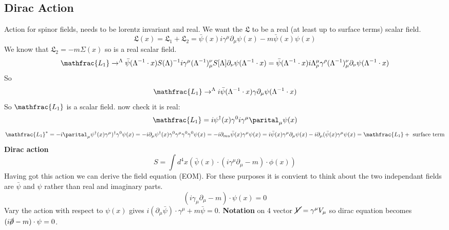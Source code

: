 \documentclass[12pt, a4paper, twoside, titlepage]{article}
\begin{document}
        \subsection{Dirac Action}
        Action for spinor fields, needs to be lorentz invariant and real. We want the $\mathfrak{L}$ to be a real (at least up to surface terms) scalar field. 
        $$
        \mathfrak{L}(x) = \mathfrak{L_1} + \mathfrak{L_2} = \bar \psi(x) i \gamma^{\mu} \partial _{\mu} \psi(x) - m \bar \psi(x) \psi(x)
        $$
        We know that $\mathfrak{L_2} = - m \Sigma(x)$ so is a real scalar field.
        $$
        \mathfrac{L_1} \rightarrow^{\Lambda} \bar \psi(\Lambda^{-1} \cdot x) S(\Lambda)^{-1} i \gamma^{\mu} (\Lambda^{-1})^{\nu}_{\mu} S[\Lambda] \partial _{\nu} \psi(\Lambda^{-1} \cdot x) = \bar \psi( \Lambda^{-1} \cdot x) i \Lambda^{\mu}_{\rho} \gamma^{\rho} (\Lambda^{-1})^{\nu}_{\mu} \partial _{\nu} \psi(\Lambda^{-1} \cdot x)
        $$
        So
        $$
        \mathfrac{L_1} \rightarrow^{\Lambda} i \bar \psi(\Lambda^{-1} \cdot x) \gamma \partial_{\mu} \psi(\Lambda^{-1} \cdot x)
        $$
        So $\mathfrac{L_1}$ is a scalar field. now check it is real:
        $$
        \mathfrac{L_1} = i \psi^{\dagger}(x) \gamma^0 i \gamma^{\mu} \parital_{\mu} \psi(x)
        $$
        $$
        \mathfrac{L_1}^* = -i \parital_{\mu} \psi^{\dagger}(x) \gamma^{\mu})^{\dagger}  \gamma^0 \psi(x) = - i \partial_{\mu} \psi^{\dagger}(x) \gamma^0 \gamma ^{\mu} \gamma^0 \gamma^0 \psi(x) = - i \partial_{mu} \bar \psi(x) \gamma^{\mu} \psi(x) = i \bar \psi(x) \gamma^{\mu} \partial_{\mu} \psi(x) - i \partial_{\mu} (\bar \psi(x) \gamma^{\mu} \psi(x) = \mathfrac{L_1} + \text{ surface term}
        $$
        \textbf{Dirac action}
        \begin{equation}
                S = \int d^4 x (\bar \psi(x) \cdot (i \gamma^{\mu}\partial_{\mu} - m) \cdot \phi(x))
        \end{equation}
        Having got this action we can derive the field equation (EOM). For these purposes it is convient to think about the two independant fields are $\bar \psi$ and $\psi$ rather than real and imaginary parts.
        \begin{equation}
                (i \gamma_{\mu}\partial_{\mu} -  m) \cdot \psi(x) = 0
\end{equation}
Vary the action with respect to $\psi(x)$ gives $i(\partial_{\mu} \bar \psi) \cdot \gamma^{\mu} + m \bar \psi  = 0$. \textbf{Notation}  on 4 vector $\cancel{V} = \gamma^{\mu} V_{\mu}$ so dirac equation becomes $(i \cancel{\partial} - m )\cdot \psi = 0$.\\\\
\end{document}
